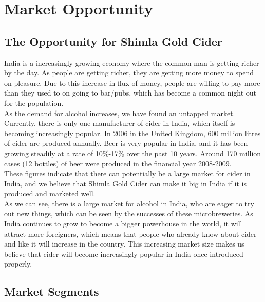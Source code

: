\documentclass[11pt]{article}
\begin{document}
\section{Market Opportunity}
  \subsection{The Opportunity for Shimla Gold Cider}

India is a increasingly growing economy where the common man is getting richer by the day. As people are getting richer, they are getting more money to spend on pleasure. Due to this increase in flux of money, people are willing to pay more than they used to on going to bar/pubs, which has become a common night out for the population. \\

\noindent As the demand for alcohol increases, we have found an untapped market. Currently, there is only one manufacturer of cider in India, which itself is becoming increasingly popular. In 2006 in the United Kingdom, 600 million litres of cider are produced annually. Beer is very popular in India, and it has been growing steadily at a rate of 10\%-17\% over the past 10 years. Around 170 million cases (12 bottles) of beer were produced in the financial year 2008-2009. \\

\noindent These figures indicate that there can potentially be a large market for cider in India, and we believe that Shimla Gold Cider can make it big in India if it is produced and marketed well. \\

\noindent As we can see, there is a large market for alcohol in India, who are eager to try out new things, which can be seen by the successes of these microbreweries. As India continues to grow to become a bigger powerhouse in the world, it will attract more foreigners, which means that people who already know about cider and like it will increase in the country. This increasing market size makes us believe that cider will become increasingly popular in India once introduced properly.
 
  \subsection{Market Segments}

\newpage
\end{document}
